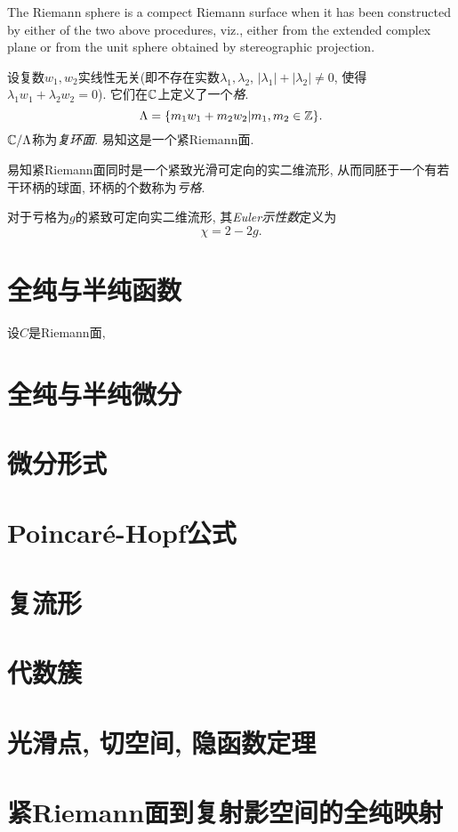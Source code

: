 \begin{example}[The set of extended complex numbers $\Sigma=\C\cup\{\infty\}$ (one point compactification of complex numbers)]
    The Riemann sphere is a compect Riemann surface when it has been constructed by either of the two above procedures, viz., either from the extended complex plane or from the unit sphere obtained by stereographic projection. 
\end{example}
\begin{example}
    设复数$w_1,w_2$实线性无关(即不存在实数$\lambda_1,\lambda_2$, $|\lambda_1|+|\lambda_2|\neq0$, 使得$\lambda_1w_1+\lambda_2w_2=0$). 它们在$\mathbb{C}$上定义了一个\textit{格}. 
    \[\Lambda=\{m_1w_1+m_2w_2|m_1,m_2\in\mathbb{Z}\}. \]
    $\mathbb{C}/\Lambda$称为\textit{复环面}. 易知这是一个紧Riemann面. 
\end{example}

易知紧Riemann面同时是一个紧致光滑可定向的实二维流形, 从而同胚于一个有若干环柄的球面, 环柄的个数称为\textit{亏格}. 
\begin{definition}
    对于亏格为$g$的紧致可定向实二维流形, 其\textit{Euler示性数}定义为
    \[\chi=2-2g. \]
\end{definition}
\section{全纯与半纯函数}\label{s1-3}
\begin{definition}
    设$C$是Riemann面, 
\end{definition}
\section{全纯与半纯微分}\label{s1-4}

\section{微分形式}\label{s1-5}

\section{Poincar\texorpdfstring{\'e}{e}-Hopf公式}\label{s1-6}

\section{复流形}\label{s1-7}

\section{代数簇}\label{s1-8}

\section{光滑点, 切空间, 隐函数定理}\label{s1-9}

\section{紧Riemann面到复射影空间的全纯映射}\label{s1-15}
